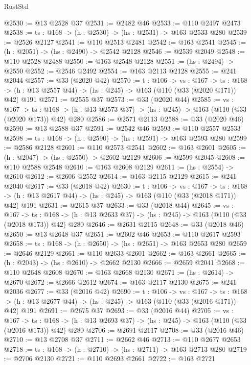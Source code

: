 \begin{lexlean}{RustStd}
\begin{coremodule}
{\begin{coremodule}
{{{@2530 := @13 @2528 @37
@2531 := @2482 @46
@2533 := @110 @2497 @2473
@2538 := {ts : @168} -> (h : @2530) -> (hs : @2531) -> @163 @2533 @280
@2539 := @2526 @2127
@2541 := @110 @2513 @2481
@2542 := @163 @2541
@2545 := (h : @2051) -> (hs : @2490) -> @2542 @2128
@2546 := @2539 @2049
@2548 := @110 @2528 @2488
@2550 := @163 @2548 @2128
@2551 := (hs : @2494) -> @2550
@2552 := @2546 @2492
@2554 := @163 @2113 @2128
@2555 := @241 @2044
@2557 := @33 (@2020 @42)
@2570 := {t : @106} ->
  {vs : @167} ->
  {ts : @168} -> (h : @13 @2557 @44) -> (hs : @245) -> @163 (@110 (@33 (@2020 @171)) @42) @191
@2571 := @2555 @37
@2573 := @33 (@2020 @44)
@2585 := {vs : @167} ->
  {ts : @168} -> (h : @13 @2573 @37) -> (hs : @245) -> @163 (@110 (@33 (@2020 @173)) @42) @280
@2586 := @2571 @2113
@2588 := @33 (@2020 @46)
@2590 := @13 @2588 @37
@2591 := @2542 @46
@2593 := @110 @2557 @2533
@2598 := {ts : @168} -> (h : @2590) -> (hs : @2591) -> @163 @2593 @280
@2599 := @2586 @2128
@2601 := @110 @2573 @2541
@2602 := @163 @2601
@2605 := (h : @2047) -> (hs : @2550) -> @2602 @2129
@2606 := @2599 @2045
@2608 := @110 @2588 @2548
@2610 := @163 @2608 @2129
@2611 := (hs : @2554) -> @2610
@2612 := @2606 @2552
@2614 := @163 @2115 @2129
@2615 := @241 @2040
@2617 := @33 (@2018 @42)
@2630 := {t : @106} ->
  {vs : @167} ->
  {ts : @168} -> (h : @13 @2617 @44) -> (hs : @245) -> @163 (@110 (@33 (@2018 @171)) @42) @191
@2631 := @2615 @37
@2633 := @33 (@2018 @44)
@2645 := {vs : @167} ->
  {ts : @168} -> (h : @13 @2633 @37) -> (hs : @245) -> @163 (@110 (@33 (@2018 @173)) @42) @280
@2646 := @2631 @2115
@2648 := @33 (@2018 @46)
@2650 := @13 @2648 @37
@2651 := @2602 @46
@2653 := @110 @2617 @2593
@2658 := {ts : @168} -> (h : @2650) -> (hs : @2651) -> @163 @2653 @280
@2659 := @2646 @2129
@2661 := @110 @2633 @2601
@2662 := @163 @2661
@2665 := (h : @2043) -> (hs : @2610) -> @2662 @2130
@2666 := @2659 @2041
@2668 := @110 @2648 @2608
@2670 := @163 @2668 @2130
@2671 := (hs : @2614) -> @2670
@2672 := @2666 @2612
@2674 := @163 @2117 @2130
@2675 := @241 @2036
@2677 := @33 (@2016 @42)
@2690 := {t : @106} ->
  {vs : @167} ->
  {ts : @168} -> (h : @13 @2677 @44) -> (hs : @245) -> @163 (@110 (@33 (@2016 @171)) @42) @191
@2691 := @2675 @37
@2693 := @33 (@2016 @44)
@2705 := {vs : @167} ->
  {ts : @168} -> (h : @13 @2693 @37) -> (hs : @245) -> @163 (@110 (@33 (@2016 @173)) @42) @280
@2706 := @2691 @2117
@2708 := @33 (@2016 @46)
@2710 := @13 @2708 @37
@2711 := @2662 @46
@2713 := @110 @2677 @2653
@2718 := {ts : @168} -> (h : @2710) -> (hs : @2711) -> @163 @2713 @280
@2719 := @2706 @2130
@2721 := @110 @2693 @2661
@2722 := @163 @2721
}}}
\end{coremodule}}
\end{coremodule}
\end{lexlean}
